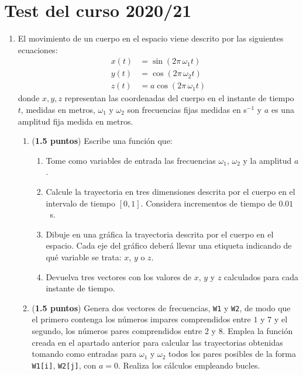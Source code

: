 \section{Test del curso 2020/21}
\begin{enumerate}

\item  El movimiento de un cuerpo en el espacio viene descrito por las siguientes ecuaciones:
\begin{align}
x(t) &= \sin(2 \pi \, \omega_1 t)\\
y(t) &= \cos(2 \pi \, \omega_2 t)\\
z(t) &= a\cos(2\pi \, \omega_1 t)
\end{align}
donde $x,y,z$ representan las coordenadas del cuerpo en el instante de tiempo $t$, medidas en metros, $\omega_1$ y $\omega_2$ son frecuencias fijas medidas en s$^{-1}$ y $a$ es una amplitud fija medida en metros.

\begin{enumerate}
	\item (\textbf{1.5 puntos}) Escribe una función que:
	\begin{enumerate}
		\item Tome como variables de entrada las frecuencias $\omega_1$, $\omega_2$ y la amplitud $a$.
		\item Calcule la trayectoria en tres dimensiones descrita por el cuerpo en el intervalo de tiempo $[0,1]$. Considera incrementos de tiempo de $0.01$~s.
		\item Dibuje en una gráfica la trayectoria descrita por el cuerpo en el espacio. Cada eje del gráfico deberá llevar una etiqueta indicando de qué variable se trata: $x$, $y$ o $z$.
		\item Devuelva tres vectores con los valores de $x$, $y$ y $z$ calculados para cada instante de tiempo.
	\end{enumerate}

	\item (\textbf{1.5 puntos}) Genera dos vectores de frecuencias, \texttt{W1} y \texttt{W2}, de modo que el primero contenga los números impares comprendidos entre $1$ y $7$ y el segundo, los números pares comprendidos entre $2$ y $8$. Emplea la función creada en el apartado anterior para calcular las trayectorias obtenidas tomando como entradas para $\omega_1$ y $\omega_2$ todos los pares posibles de la forma \texttt{W1[i]}, \texttt{W2[j]}, con $a=0$. Realiza los cálculos empleando bucles.


\end{enumerate}
\end{enumerate}
